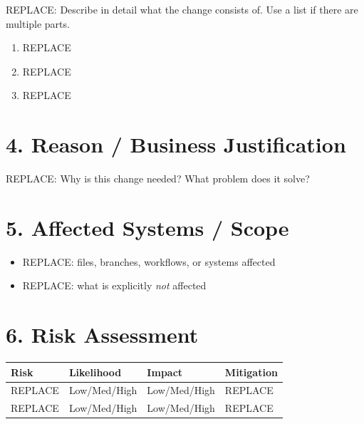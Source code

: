 \documentclass[11pt]{article}
\begin{document}
REPLACE: Describe in detail what the change consists of. Use a list if there are multiple parts.

\begin{enumerate}[label=\arabic*.]
    \item REPLACE
    \item REPLACE
    \item REPLACE
\end{enumerate}

\section*{4. Reason / Business Justification}

REPLACE: Why is this change needed? What problem does it solve?

\section*{5. Affected Systems / Scope}

\begin{itemize}
    \item REPLACE: files, branches, workflows, or systems affected
    \item REPLACE: what is explicitly \emph{not} affected
\end{itemize}

\section*{6. Risk Assessment}

\begin{longtable}{|p{4cm}|p{2cm}|p{2cm}|p{5.5cm}|}
\hline
\textbf{Risk} & \textbf{Likelihood} & \textbf{Impact} & \textbf{Mitigation} \\
\hline
REPLACE & Low/Med/High & Low/Med/High & REPLACE \\
\hline
REPLACE & Low/Med/High & Low/Med/High & REPLACE \\
\hline
\end{longtable}
\end{document}
